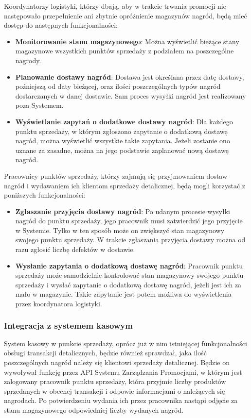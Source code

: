 \documentclass[a4paper,12pt]{article}
\begin{document}
Koordynatorzy logistyki, którzy dbają, aby w trakcie trwania promocji nie następowało przepełnienie ani zbytnie opróżnienie magazynów nagród, będą mieć dostęp do następnych funkcjonalności:
\begin{itemize}
    \item \textbf{Monitorowanie stanu magazynowego}:
    Można wyświetlić bieżące stany magazynowe wszystkich punktów sprzedaży z podziałem na poszczególne nagrody.
    \item \textbf{Planowanie dostawy nagród}:
    Dostawa jest określana przez datę dostawy, poźniejszą od daty bieżącej, oraz ilości poszczególnych typów nagród dostarczanych w danej dostawie.
    Sam proces wysyłki nagród jest realizowany poza Systemem.
    \item \textbf{Wyświetlanie zapytań o dodatkowe dostawy nagród}:
    Dla każdego punktu sprzedaży, w którym zgłoszono zapytanie o dodatkową dostawę nagród, można wyświetlić wszystkie takie zapytania.
    Jeżeli zostanie ono uznane za zasadne, można na jego podstawie zaplanować nową dostawę nagród.
\end{itemize}

Pracownicy punktów sprzedaży, którzy zajmują się przyjmowaniem dostaw nagród i wydawaniem ich klientom sprzedaży detalicznej, będą mogli korzystać z poniższych funkcjonalności:
\begin{itemize}
    \item \textbf{Zgłaszanie przyjęcia dostawy nagród}:
    Po udanym procesie wysyłki nagród do punktu sprzedaży, jego pracownik musi zatwierdzić jego przyjęcie w Systemie.
    Tylko w ten sposób może on zwiększyć stan magazynowy swojego punktu sprzedaży.
    W trakcie zgłaszania przyjęcia dostawy można od razu zgłosić liczbę defektów w dostawie.
    \item \textbf{Wysłanie zapytania o dodatkową dostawę nagród}:
    Pracownik punktu sprzedaży może samodzielnie kontrolować stan magazynowy swojego punktu sprzedaży i wysłać zapytanie o dodatkową dostawę nagród, jeżeli jest ich za mało w magazynie.
    Takie zapytanie jest potem możliwa do wyświetlenia przez koordynatora logistyki.
\end{itemize}

\subsubsection{Integracja z systemem kasowym}

System kasowy w punkcie sprzedaży, oprócz już w nim istniejącej funkcjonalności obsługi transakcji detalicznych, będzie również sprawdzał, jaka ilość poszczególnych nagród należy się klientowi sprzedaży detalicznej.
Będzie on wywoływał funkcję przez API Systemu Zarządzania Promocjami, w którym jest zalogowany pracownik punktu sprzedaży, która przyjmie liczby produktów sprzedanych w obecnej transakcji i odpowie informacjami o należących się nagrodach.
Po potwierdzeniu wydania ich przez pracownika nastąpi odjęcie za stanu magazynowego odpowiedniej liczby wydanych nagród.
\end{document}
